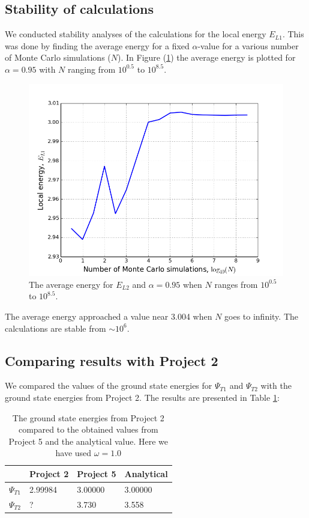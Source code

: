 \documentclass[norsk,a4paper,12pt]{article}
\begin{document}
\subsection{Stability of calculations}
We conducted stability analyses of the calculations for the local energy $E_{L1}$. This was done by finding the average energy for a fixed $\alpha$-value for a various number of Monte Carlo simulations ($N$). In Figure (\ref{fig:stability}) the average energy is plotted for $\alpha=0.95$ with $N$ ranging from $10^{0.5}$ to $10^{8.5}$.
\begin{figure} [H]
    \centering
    \includegraphics[width=12cm]{E_L1_alpha=0_95_stability.png}
    \caption{The average energy for $E_{L2}$ and $\alpha=0.95$ when $N$ ranges from $10^{0.5}$ to $10^{8.5}$.}
    \label{fig:stability}
\end{figure}
The average energy approached a value near 3.004 when $N$ goes to infinity. The calculations are stable from $\sim10^6$. 
\subsection{Comparing results with Project 2}\par 

We compared the values of the ground state energies for $\Psi_{T1}$ and $\Psi_{T2}$ with the ground state energies from Project 2. The results are presented in Table \ref{tab:energies_comparing}: 

\begin{table} [H]
\centering
\caption{The ground state energies from Project 2 compared to the obtained values from Project 5 and the analytical value. Here we have used $\omega = 1.0$}

\begin{tabularx}{\textwidth}{XXXX} \hline
\label{tab:energies_comparing}
{\bf } & {\bf Project 2 } & {\bf Project 5 } & {\bf Analytical} \\ \hline
{$\Psi_{T1} $} & 2.99984 & 3.00000 & 3.00000\\ \hline
{$\Psi_{T2} $} & ? & 3.730 & 3.558 \\ \hline
\end{tabularx}
\end{table}
\end{document}
